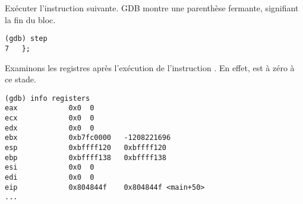 Exécuter l'instruction suivante.
\ac{GDB} montre une parenthèse fermante, signifiant la fin du bloc.

\begin{lstlisting}
(gdb) step
7	};
\end{lstlisting}

Examinons les registres après l'exécution de l'instruction .
En effet, \EAX est à zéro à ce stade.

\begin{lstlisting}
(gdb) info registers
eax            0x0	0
ecx            0x0	0
edx            0x0	0
ebx            0xb7fc0000	-1208221696
esp            0xbffff120	0xbffff120
ebp            0xbffff138	0xbffff138
esi            0x0	0
edi            0x0	0
eip            0x804844f	0x804844f <main+50>
...
\end{lstlisting}

